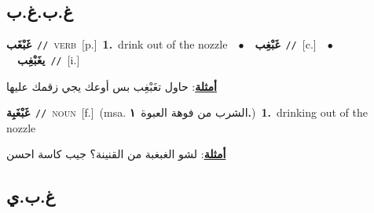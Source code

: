 \documentclass[10pt,a4paper,twoside]{article} %
\begin{document}
\begin{multicols}{2}
\vspace{-3mm}
\subsection*{\color{blue}\foreignlanguage{arabic}{غ.ب.غ.ب}\color{blue}{}} 

{\setlength\topsep{0pt}\textbf{\foreignlanguage{arabic}{غَبْغَب}}\ {\color{gray}\texttt{//}\color{black}}\ \textsc{verb}\ [p.]\ \textbf{1.}~drink out of the nozzle\ \ $\bullet$\ \ \setlength\topsep{0pt}\textbf{\foreignlanguage{arabic}{غَبْغِب}}\ {\color{gray}\texttt{//}\color{black}}\ [c.]\ \ $\bullet$\ \ \setlength\topsep{0pt}\textbf{\foreignlanguage{arabic}{يغَبْغِب}}\ {\color{gray}\texttt{//}\color{black}}\ [i.]\  \begin{flushright}\color{gray}\foreignlanguage{arabic}{\textbf{\underline{\foreignlanguage{arabic}{أمثلة}}}: حاول تغَبْغِب بس أوعك يجي زقمك عليها}\end{flushright}\color{black}} \vspace{2mm}

{\setlength\topsep{0pt}\textbf{\foreignlanguage{arabic}{غَبْغَبِة}}\ {\color{gray}\texttt{//}\color{black}}\ \textsc{noun}\ [f.]\ \color{gray}(msa. \foreignlanguage{arabic}{الشرب من فوهة العبوة}~\foreignlanguage{arabic}{\textbf{١.}})\color{black}\ \textbf{1.}~drinking out of the nozzle\  \begin{flushright}\color{gray}\foreignlanguage{arabic}{\textbf{\underline{\foreignlanguage{arabic}{أمثلة}}}: لشو الغبغبة من القنينة؟ جيب كاسة احسن}\end{flushright}\color{black}} \vspace{2mm}

\vspace{-3mm}
\subsection*{\color{blue}\foreignlanguage{arabic}{غ.ب.ي}\color{blue}{}} 


\end{multicols}
\end{document}
